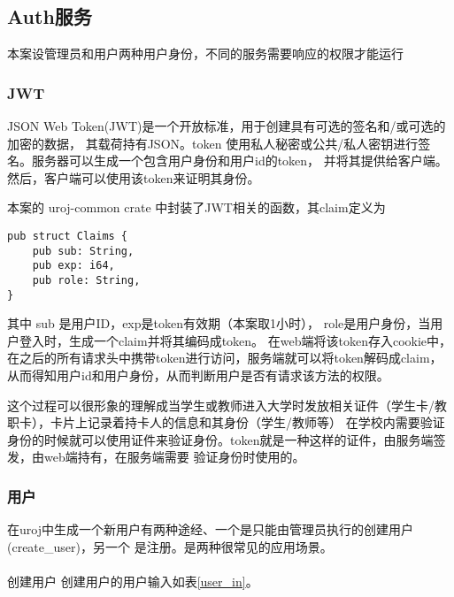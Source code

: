 \subsection{Auth服务}
本案设管理员和用户两种用户身份，不同的服务需要响应的权限才能运行
\subsubsection{JWT}
JSON Web Token(JWT)是一个开放标准，用于创建具有可选的签名和/或可选的加密的数据，
其载荷持有JSON。token 使用私人秘密或公共/私人密钥进行签名\cite{rfc7519}。服务器可以生成一个包含用户身份和用户id的token，
并将其提供给客户端。然后，客户端可以使用该token来证明其身份。

本案的 uroj-common crate 中封装了JWT相关的函数，其claim定义为
\begin{lstlisting}
pub struct Claims {
    pub sub: String,
    pub exp: i64,
    pub role: String,
}
\end{lstlisting}

其中 sub 是用户ID，exp是token有效期（本案取1小时），
role是用户身份，当用户登入时，生成一个claim并将其编码成token。
在web端将该token存入cookie中，在之后的所有请求头中携带token进行访问，服务端就可以将token解码成claim，
从而得知用户id和用户身份，从而判断用户是否有请求该方法的权限。

这个过程可以很形象的理解成当学生或教师进入大学时发放相关证件（学生卡/教职卡），卡片上记录着持卡人的信息和其身份（学生/教师等）
在学校内需要验证身份的时候就可以使用证件来验证身份。token就是一种这样的证件，由服务端签发，由web端持有，在服务端需要
验证身份时使用的。

\subsubsection{用户}
在uroj中生成一个新用户有两种途经、一个是只能由管理员执行的创建用户(create\_user)，另一个
是注册。是两种很常见的应用场景。

\paragraph{}创建用户
创建用户的用户输入如表\ref{user_in}。

